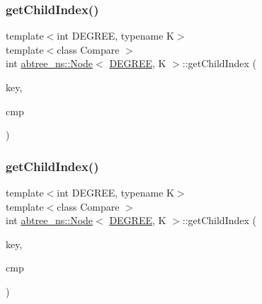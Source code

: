 \subsubsection{\texorpdfstring{get\+Child\+Index()}{getChildIndex()}\hspace{0.1cm}{\footnotesize\ttfamily [1/2]}}
{\footnotesize\ttfamily template$<$int D\+E\+G\+R\+EE, typename K$>$ \\
template$<$class Compare $>$ \\
int \hyperlink{structabtree__ns_1_1Node}{abtree\+\_\+ns\+::\+Node}$<$ \hyperlink{brown__sigouin__abtree__kcas_2adapter_8h_a5d88b17d70c985f2f2b8e987037fd6dd}{D\+E\+G\+R\+EE}, K $>$\+::get\+Child\+Index (\begin{DoxyParamCaption}\item[{const K \&}]{key,  }\item[{Compare}]{cmp }\end{DoxyParamCaption})\hspace{0.3cm}{\ttfamily [inline]}}

\mbox{\label{structabtree__ns_1_1Node_a1229e769cf5d2e1f67405dc689e64595}} 
\subsubsection{\texorpdfstring{get\+Child\+Index()}{getChildIndex()}\hspace{0.1cm}{\footnotesize\ttfamily [2/2]}}
{\footnotesize\ttfamily template$<$int D\+E\+G\+R\+EE, typename K$>$ \\
template$<$class Compare $>$ \\
int \hyperlink{structabtree__ns_1_1Node}{abtree\+\_\+ns\+::\+Node}$<$ \hyperlink{brown__sigouin__abtree__kcas_2adapter_8h_a5d88b17d70c985f2f2b8e987037fd6dd}{D\+E\+G\+R\+EE}, K $>$\+::get\+Child\+Index (\begin{DoxyParamCaption}\item[{const K \&}]{key,  }\item[{Compare}]{cmp }\end{DoxyParamCaption})\hspace{0.3cm}{\ttfamily [inline]}}

\mbox{\label{structabtree__ns_1_1Node_a17222fc44db1651a08225e97bab6644e}} 
